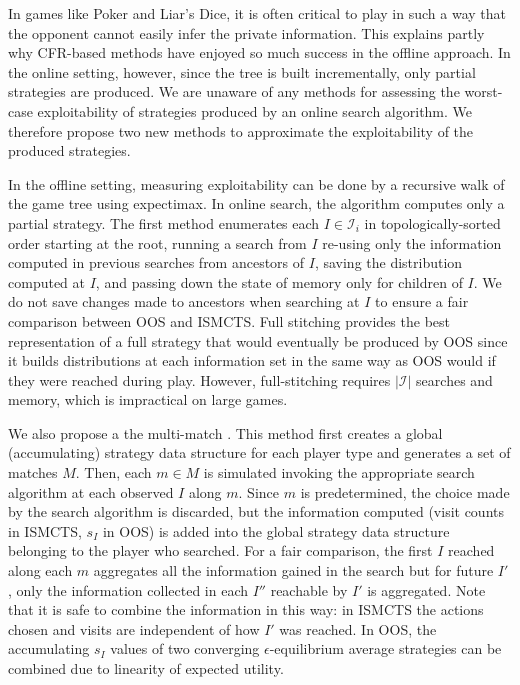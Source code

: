 \documentclass[letterpaper]{article}
\newcommand{\cI}{\mathcal{I}}
\newcommand{\defword}[1]{\textbf{\boldmath{#1}}}
\begin{document}

In games like Poker and Liar's Dice, it is often critical to play in such a way that the opponent 
cannot easily infer the private information. This explains partly why CFR-based methods have 
enjoyed so much success in the offline approach. 
In the online setting, however, since the tree is built incrementally, only partial strategies
are produced. 
We are unaware of any methods for assessing the worst-case exploitability of strategies 
produced by an online search algorithm. 
We therefore propose two new methods to approximate the exploitability of the produced strategies. 

In the offline setting, measuring exploitability can be done by a recursive walk of the game 
tree using expectimax. In online search, the algorithm computes only 
a partial strategy. 
The first \defword{full stitching} method 
enumerates each $I \in \cI_i$ in topologically-sorted order starting at the root, 
running a search from $I$ re-using only the information computed in previous searches from ancestors of $I$, saving the 
distribution computed at $I$, and passing down the state of memory only for children of $I$. 
We do not save changes made to ancestors when searching at $I$ to ensure 
a fair comparison between OOS and ISMCTS. Full stitching provides the best representation of a full strategy
that would eventually be produced by OOS since it builds distributions at each information set in the 
same way as OOS would if they were reached during play.
However, full-stitching requires $|\cI|$ searches and memory, which is impractical on large games. 

We also propose a the multi-match \defword{aggregate method}. 
This method first creates a global (accumulating) strategy data structure for each player type and generates a 
set of matches $M$. Then, each $m \in M$ is simulated invoking the appropriate search algorithm at each observed 
$I$ along $m$. 
Since $m$ is predetermined, the choice made by the search algorithm is discarded, but the information computed 
(visit counts in ISMCTS, $s_I$ in OOS) is added into the global strategy data structure belonging to the player
who searched. 
For a fair comparison, the first $I$ reached along each $m$ aggregates all the information gained in the search 
but for future $I'$, only the information collected in each $I''$ reachable by $I'$ is aggregated.
Note that it is safe to combine the information in this way: in ISMCTS the actions chosen and visits are independent of 
how $I'$ was reached. In OOS, the accumulating $s_I$ values of two converging $\epsilon$-equilibrium average 
strategies can be combined due to linearity of expected utility. 
\end{document}
